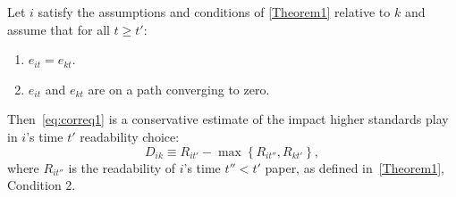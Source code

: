 \begin{corollary}\label{Corollary1}
	Let $i$ satisfy the assumptions and conditions of \autoref{Theorem1} relative to $k$ and assume that for all $t\ge t'$:
	\begin{enumerate}[label=Assumption \arabic*., leftmargin=*, widest*=2, start=4]
		\item $e_{it}=e_{kt}$.
		\item $e_{it}$ and $e_{kt}$ are on a path converging to zero.
	\end{enumerate}
	Then~\autoref{eq:correq1} is a conservative estimate of the impact higher standards play in $i$'s time $t'$ readability choice:
	\begin{equation}
		D_{ik}\equiv R_{it'}-\max\left\{R_{it''},R_{kt'}\right\},
		\label{eq:correq1}
	\end{equation}
	where $R_{it''}$ is the readability of $i$'s time $t''<t'$ paper, as defined in~\autoref{Theorem1}, Condition 2.
\end{corollary}